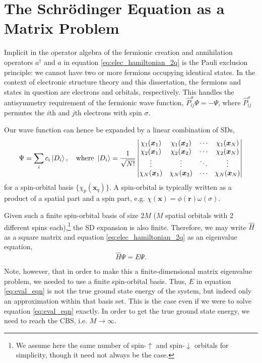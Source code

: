 \section{The Schr\"odinger Equation as a Matrix Problem}
\label{sec:matrix}

Implicit in the operator algebra of the fermionic creation and annihilation operators $a^\dag$ and $a$ in equation \ref{eq:elec_hamiltonian_2q} is the Pauli exclusion principle: we cannot have two or more fermions occupying identical states. In the context of electronic structure theory and this dissertation, the fermions and states in question are electrons and orbitals, respectively. This handles the antisymmetry requirement of the fermionic wave function, $\hat P_{ij}^\sigma\Psi = -\Psi$, where $\hat P_{ij}^\sigma$ permutes the $i$th and $j$th electrons with spin $\sigma$.

Our wave function can hence be expanded by a linear combination of \glspl{SD},
\begin{equation}
    \label{eq:SD_expansion}
\Psi = \sum_i c_i \ket{D_i},
\quad \text{where } \ket{D_i} =
\frac 1{\sqrt{N!}}\left|
    \begin{matrix}
        \chi_1(\bm x_1) & \chi_1(\bm x_2) & \cdots & \chi_1(\bm x_N)\\
        \chi_2(\bm x_1) & \chi_2(\bm x_2) & \cdots & \chi_2(\bm x_N)\\
        \vdots & \vdots & \ddots & \vdots\\
        \chi_N(\bm x_1) & \chi_N(\bm x_2) & \cdots & \chi_N(\bm x_N)\\
    \end{matrix}
 \right|
\end{equation}
for a spin-orbital basis $\{\chi_p(\bm x_q)\}$. A spin-orbital is typically written as a product of a spatial part and a spin part, e.g. $\chi(\bm x) = \phi(\bm r)\omega(\sigma)$.

Given such a finite spin-orbital basis of size $2M$ ($M$ spatial orbitals with 2 different spins each),\footnote{We assume here the same number of spin-$\uparrow$ and spin-$\downarrow$ orbitals for simplicity, though it need not always be the case.} the \gls{SD} expansion is also finite. Therefore, we may write $\hat H$ as a square matrix and equation \ref{eq:elec_hamiltonian_2q} as an eigenvalue equation,
\begin{equation}
\label{eq:eval_eqn}
\hat H\Psi = E\Psi.
\end{equation}

Note, however, that in order to make this a finite-dimensional matrix eigenvalue problem, we needed to use a finite spin-orbital basis. Thus, $E$ in equation \ref{eq:eval_eqn} is not the true ground state energy of the system, but indeed only an approximation within that basis set. This is the case even if we were to solve equation \ref{eq:eval_eqn} exactly. In order to get the true ground state energy, we need to reach the \gls{CBS}, i.e. $M\to\infty$.

